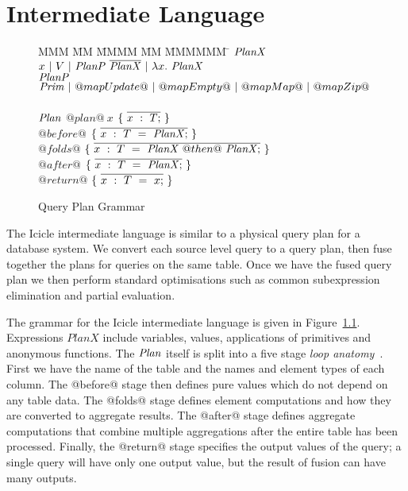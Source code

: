 \chapter{Intermediate Language}
\label{icicle:s:IcicleCore}

\begin{figure}

\begin{tabbing}
MMM \= MM \= MMMM \= MM \= MMMMMM \= \kill
$\mathit{PlanX}$
\GrammarDefTab
  $x~|~V~|~\mathit{PlanP}~\overline{\mathit{PlanX}}~|~\lambda{}x.~\mathit{PlanX}$
\\
$\mathit{PlanP}$
\GrammarDefTab
  $\mathit{Prim}~|~@mapUpdate@~|~@mapEmpty@~|~@mapMap@~|~@mapZip@$
\\
\\
$\mathit{Plan}$
\GrammarDefTab
  $@plan@~x$ \> $\{~\overline{x~:~T;}~\}$
\\
  \> \> $@before@$ \> $\{~\overline{x~:~T~=~\mathit{PlanX};}~\}$ \\
  \> \> $@folds@$  \> $\{~\overline{x~:~T~=~\mathit{PlanX}~@then@~\mathit{PlanX};}~\}$ \\
  \> \> $@after@$  \> $\{~\overline{x~:~T~=~\mathit{PlanX};}~\}$ \\
  \> \> $@return@$ \> $\{~\overline{x~:~T~=~x;}~\}$ \\
\end{tabbing}



\caption{Query Plan Grammar}
\label{icicle:fig:core:grammar}
\end{figure}

The Icicle intermediate language is similar to a physical query plan for a database system. We convert each source level query to a query plan, then fuse together the plans for queries on the same table. Once we have the fused query plan we then perform standard optimisations such as common subexpression elimination and partial evaluation.

The grammar for the Icicle intermediate language is given in Figure~\ref{icicle:fig:core:grammar}.
Expressions $PlanX$ include variables, values, applications of primitives and anonymous functions.
The $\mathit{Plan}$ itself is split into a five stage \emph{loop anatomy}~\cite{shivers2005anatomy}. First we have the name of the table and the names and element types of each column. The @before@ stage then defines pure values which do not depend on any table data. The @folds@ stage defines element computations and how they are converted to aggregate results. The @after@ stage defines aggregate computations that combine multiple aggregations after the entire table has been processed. Finally, the @return@ stage specifies the output values of the query; a single query will have only one output value, but the result of fusion can have many outputs.

